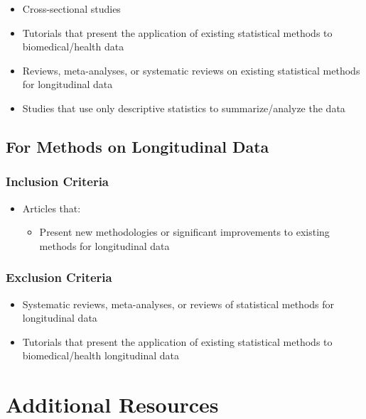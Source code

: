 \documentclass[
]{article}
\providecommand{\tightlist}{%
  \setlength{\itemsep}{0pt}\setlength{\parskip}{0pt}}\usepackage{longtable,booktabs,array}
\begin{document}
\begin{itemize}
\item
  Cross-sectional studies
\item
  Tutorials that present the application of existing statistical methods
  to biomedical/health data
\item
  Reviews, meta-analyses, or systematic reviews on existing statistical
  methods for longitudinal data
\item
  Studies that use only descriptive statistics to summarize/analyze the
  data
\end{itemize}

\hypertarget{for-methods-on-longitudinal-data-1}{%
\subsection{For Methods on Longitudinal
Data}\label{for-methods-on-longitudinal-data-1}}

\hypertarget{inclusion-criteria-1}{%
\subsubsection{Inclusion Criteria}\label{inclusion-criteria-1}}

\begin{itemize}
\item
  Articles that:

  \begin{itemize}
  \tightlist
  \item
    Present new methodologies or significant improvements to existing
    methods for longitudinal data
  \end{itemize}
\end{itemize}

\hypertarget{exclusion-criteria-1}{%
\subsubsection{Exclusion Criteria}\label{exclusion-criteria-1}}

\begin{itemize}
\item
  Systematic reviews, meta-analyses, or reviews of statistical methods
  for longitudinal data
\item
  Tutorials that present the application of existing statistical methods
  to biomedical/health longitudinal data
\end{itemize}

\hypertarget{additional-resources}{%
\section{Additional Resources}\label{additional-resources}}
\end{document}
